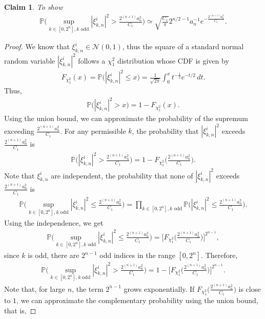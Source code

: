 \documentclass[english,a4paper,11pt]{amsart}
\theoremstyle{plain}
\newtheorem{claim}[theorem]{Claim}
\theoremstyle{definition}
\theoremstyle{remark}
\numberwithin{equation}{section}
\renewcommand{\P}{\mathbb{P}}
\begin{document}
\begin{appendix}
\begin{claim}\label{claim6.3}
	To show
	\begin{align*}
		\P\bigg(\sup_{k\in[0,2^n],k\text{ odd}}|\xi_{k,n}^i|^2> \frac{2^{(n+1)}a_n^2}{C_1}\bigg)
		\simeq
		\sqrt{\frac{C_1}{\pi} }2^{n/2-1}a_n^{-1}e^{-\frac{2^{(n+1)}a_n^2}{C_1}}.
	\end{align*}
\end{claim}
\begin{proof}
We know that $\xi_{k,n}^i\in \mathcal{N}(0,1)$, thus the square of a standard normal random variable $|\xi_{k,n}^i|^2$ follows a $\chi_1^2$ distribution whose CDF is given by 
\begin{align*}
	F_{\chi_1^2}(x) =\P\Big(|\xi_{k,n}^i|^2\leq x\Big)=\frac{1}{\sqrt{2\pi}}\int_0^xt^{-\frac{1}{2}} e^{-t/2}\,dt. 
\end{align*}Thus, 
\begin{align*}
	\P\Big(|\xi_{k,n}^i|^2>x\Big)=1-	F_{\chi_1^2}(x) .
\end{align*}
Using the union bound, we can approximate the probability of the supremum exceeding $\frac{2^{(n+1)}a_n^2}{C_1}$. For any permissible $k$, the probability that $ |\xi_{k,n}^i|^2$ exceeds $ \frac{2^{(n+1)}a_n^2}{C_1}$ is
\begin{align*}
	\P\Big(|\xi_{k,n}^i|^2> \frac{2^{(n+1)}a_n^2}{C_1}\Big)=1-F_{\chi_1^2}\Big(\frac{2^{(n+1)}a_n^2}{C_1}\Big).
\end{align*}Note that $\xi_{k,n}^i$ are independent, the probability that none of $|\xi_{k,n}^i|^2$ exceeds $\frac{2^{(n+1)}a_n^2}{C_1}$ is 
\begin{align*}
		\P\Big(\sup_{k\in[0,2^n],k\text{ odd}}|\xi_{k,n}^i|^2\leq \frac{2^{(n+1)}a_n^2}{C_1}\Big)=\prod_{k\in[0,2^n],k\text{ odd}}\P\Big(|\xi_{k,n}^i|^2\leq \frac{2^{(n+1)}a_n^2}{C_1}\Big).
\end{align*}Using the independence, we get 
\begin{align*}
	\P\Big(\sup_{k\in[0,2^n],k\text{ odd}}|\xi_{k,n}^i|^2\leq \frac{2^{(n+1)}a_n^2}{C_1}\Big)=
	\Big[F_{\chi_1^2}\Big(\frac{2^{(n+1)}a_n^2}{C_1}\Big)\Big]^{2^{n-1}},
\end{align*}since $k$ is odd, there are $2^{n-1}$ odd indices in the range $[0,2^n]$. Therefore,
\begin{align*}
	\P\Big(\sup_{k\in[0,2^n],k\text{ odd}}|\xi_{k,n}^i|^2> \frac{2^{(n+1)}a_n^2}{C_1}\Big)=1-
	\Big[F_{\chi_1^2}\Big(\frac{2^{(n+1)}a_n^2}{C_1}\Big)\Big]^{2^{n-1}}.
\end{align*}Note that, for large $n$, the term $2^{n-1}$ grows exponentially. If $F_{\chi_1^2}\Big(\frac{2^{(n+1)}a_n^2}{C_1}\Big)$ is close to $1$, we can approximate the complementary probability using the union bound, that is, 

\end{proof}
\end{appendix}
\end{document}
